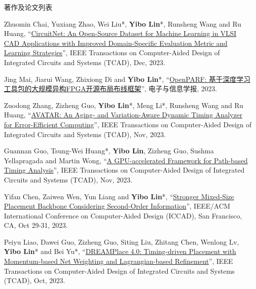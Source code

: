 \begin{rSection}{著作及论文列表}
\begin{description}[font=\normalfont, rightmargin=2em]
{}
            

\item[{[J133]}]{
        Zhuomin Chai, Yuxiang Zhao, Wei Liu*, \textbf{Yibo Lin}*, Runsheng Wang and Ru Huang, 
    ``\href{https://doi.org/10.1109/TCAD.2023.3287970}{CircuitNet: An Open-Source Dataset for Machine Learning in VLSI CAD Applications with Improved Domain-Specific Evaluation Metric and Learning Strategies}'', 
    IEEE Transactions on Computer-Aided Design of Integrated Circuits and Systems (TCAD), Dec, 2023.
    
}
            

\item[{[J132]}]{
        Jing Mai, Jiarui Wang, Zhixiong Di and \textbf{Yibo Lin}*, 
    ``\href{https://jeit.ac.cn/cn/article/doi/10.11999/JEIT230387}{OpenPARF: 基于深度学习工具包的大规模异构FPGA开源布局布线框架}'', 
    电子与信息学报, 2023.
    
}
            

\item[{[J131]}]{
        Zuodong Zhang, Zizheng Guo, \textbf{Yibo Lin}*, Meng Li*, Runsheng Wang and Ru Huang, 
    ``\href{https://doi.org/10.1109/TCAD.2023.3255167}{AVATAR: An Aging- and Variation-Aware Dynamic Timing Analyzer for Error-Efficient Computing}'', 
    IEEE Transactions on Computer-Aided Design of Integrated Circuits and Systems (TCAD), Nov, 2023.
    
}
            

\item[{[J130]}]{
        Guannan Guo, Tsung-Wei Huang*, \textbf{Yibo Lin}, Zizheng Guo, Sushma Yellapragada and Martin Wong, 
    ``\href{https://doi.org/10.1109/TCAD.2023.3272274}{A GPU-accelerated Framework for Path-based Timing Analysis}'', 
    IEEE Transactions on Computer-Aided Design of Integrated Circuits and Systems (TCAD), Nov, 2023.
    
}
            

\item[{[C129]}]{
        Yifan Chen, Zaiwen Wen, Yun Liang and \textbf{Yibo Lin}*, 
    ``\href{https://doi.org/10.1109/ICCAD57390.2023.10323700}{Stronger Mixed-Size Placement Backbone Considering Second-Order Information}'', 
    IEEE/ACM International Conference on Computer-Aided Design (ICCAD), San Francisco, CA, Oct 29-31, 2023.
    
}
            

\item[{[J128]}]{
        Peiyu Liao, Dawei Guo, Zizheng Guo, Siting Liu, Zhitang Chen, Wenlong Lv, \textbf{Yibo Lin}* and Bei Yu*, 
    ``\href{https://doi.org/10.1109/TCAD.2023.3240132}{DREAMPlace 4.0: Timing-driven Placement with Momentum-based Net Weighting and Lagrangian-based Refinement}'', 
    IEEE Transactions on Computer-Aided Design of Integrated Circuits and Systems (TCAD), Oct, 2023.
    
}
\end{description}
\end{rSection}

